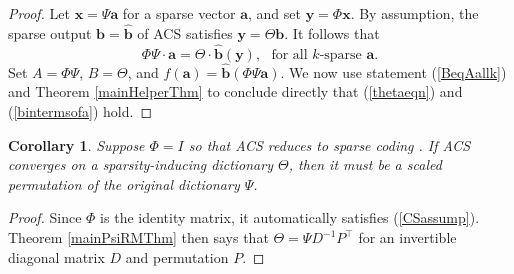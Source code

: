 \documentclass[11pt]{amsart}
\newtheorem{corollary}{Corollary}
\begin{document}
\begin{proof} Let $\mathbf{x} = \Psi \mathbf{a}$ for a sparse vector $\mathbf{a}$, and set $\mathbf{y} = \Phi \mathbf{x}$.  By assumption, the sparse output $\mathbf{b} = \widehat{\mathbf{b}}$ of ACS satisfies $\mathbf{y} = \Theta \mathbf{b}$.  %
It follows that  
\begin{equation}\label{BeqAallk}
\Phi \Psi \cdot \mathbf{a} =  \Theta \cdot  \widehat{\mathbf{b}}(\mathbf{y}), \ \ \ \text{for all $k$-sparse } \mathbf{a}.
\end{equation}
Set $A = \Phi \Psi$, $B =\Theta$, and $f(\mathbf{a}) =  \widehat{\mathbf{b}} (\Phi \Psi \mathbf{a})$.  We now use statement (\ref{BeqAallk}) and Theorem \ref{mainHelperThm} to conclude directly that (\ref{thetaeqn}) and (\ref{bintermsofa}) hold.
\end{proof}

\begin{corollary}
Suppose $\Phi = I$ so that ACS reduces to sparse coding \cite{olshausenfield1996}.  If ACS converges on a sparsity-inducing dictionary $\Theta$, then it must be a scaled permutation of the original dictionary $\Psi$.
\end{corollary}
\begin{proof}
Since $\Phi$ is the identity matrix, it automatically satisfies (\ref{CSassump}).  Theorem \ref{mainPsiRMThm} then says that $\Theta = \Psi D^{-1}P^{\top}$ for an invertible diagonal matrix $D$ and permutation $P$.
\end{proof}




\end{document}
